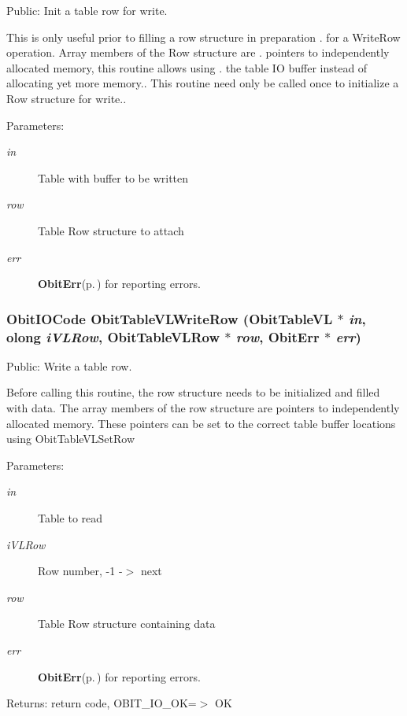 Public: Init a table row for write. 

This is only useful prior to filling a row structure in preparation . for a Write\-Row operation. Array members of the Row structure are . pointers to independently allocated memory, this routine allows using . the table IO buffer instead of allocating yet more memory.. This routine need only be called once to initialize a Row structure for write.. \begin{Desc}
\item[Parameters:]
\begin{description}
\item[{\em in}]Table with buffer to be written \item[{\em row}]Table Row structure to attach \item[{\em err}]{\bf Obit\-Err}{\rm (p.\,\pageref{structObitErr})} for reporting errors. \end{description}
\end{Desc}
\subsubsection{\setlength{\rightskip}{0pt plus 5cm}Obit\-IOCode Obit\-Table\-VLWrite\-Row ({\bf Obit\-Table\-VL} $\ast$ {\em in}, {\bf olong} {\em i\-VLRow}, {\bf Obit\-Table\-VLRow} $\ast$ {\em row}, {\bf Obit\-Err} $\ast$ {\em err})}\label{ObitTableVL_8h_a20}


Public: Write a table row. 

Before calling this routine, the row structure needs to be initialized and filled with data. The array members of the row structure are pointers to independently allocated memory. These pointers can be set to the correct table buffer locations using Obit\-Table\-VLSet\-Row \begin{Desc}
\item[Parameters:]
\begin{description}
\item[{\em in}]Table to read \item[{\em i\-VLRow}]Row number, -1 -$>$ next \item[{\em row}]Table Row structure containing data \item[{\em err}]{\bf Obit\-Err}{\rm (p.\,\pageref{structObitErr})} for reporting errors. \end{description}
\end{Desc}
\begin{Desc}
\item[Returns:]return code, OBIT\_\-IO\_\-OK=$>$ OK \end{Desc}
